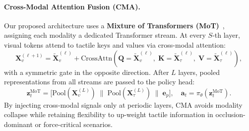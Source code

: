 \documentclass{article}
\begin{document}
\paragraph{Cross-Modal Attention Fusion (CMA).}

Our proposed architecture uses a \textbf{Mixture of Transformers (MoT)}~\citep{bao2023mot}, assigning each modality a dedicated Transformer stream. At every $S$-th layer, visual tokens attend to tactile keys and values via cross-modal attention:
\begin{equation}
    \mathbf{X}_v^{(\ell+1)}
    = \tilde{\mathbf{X}}_v^{(\ell)}
    + \mathrm{CrossAttn}\!\left(
        \mathbf{Q} = \tilde{\mathbf{X}}_v^{(\ell)},\;
        \mathbf{K} = \tilde{\mathbf{X}}_\tau^{(\ell)},\;
        \mathbf{V} = \tilde{\mathbf{X}}_\tau^{(\ell)}
    \right),
\end{equation}
with a symmetric gate in the opposite direction. After $L$ layers, pooled representations from all streams are passed to the policy head:
\begin{equation}
    \mathbf{z}_t^{\mathrm{MoT}} =
    \bigl[\mathrm{Pool}(\mathbf{X}_v^{(L)}) \;\|\;
    \mathrm{Pool}(\mathbf{X}_\tau^{(L)}) \;\|\; \mathbf{e}_p\bigr],
    \quad \mathbf{a}_t = \pi_\theta\!\left(\mathbf{z}_t^{\mathrm{MoT}}\right).
\end{equation}
By injecting cross-modal signals only at periodic layers, CMA avoids modality collapse while retaining flexibility to up-weight tactile information in occlusion-dominant or force-critical scenarios.
\end{document}
